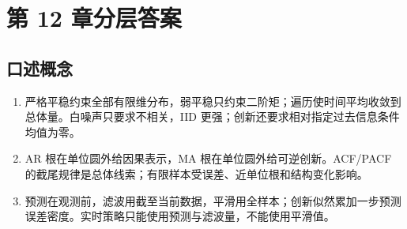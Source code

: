 \chapter{第 12 章分层答案}
\label{app:ch12-solutions}

\section*{口述概念}
\begin{enumerate}[leftmargin=*]
\item 严格平稳约束全部有限维分布，弱平稳只约束二阶矩；遍历使时间平均收敛到总体量。白噪声只要求不相关，IID 更强；创新还要求相对指定过去信息条件均值为零。
\item AR 根在单位圆外给因果表示，MA 根在单位圆外给可逆创新。ACF/PACF 的截尾规律是总体线索；有限样本受误差、近单位根和结构变化影响。
\item 预测在观测前，滤波用截至当前数据，平滑用全样本；创新似然累加一步预测误差密度。实时策略只能使用预测与滤波量，不能使用平滑值。
\end{enumerate}

